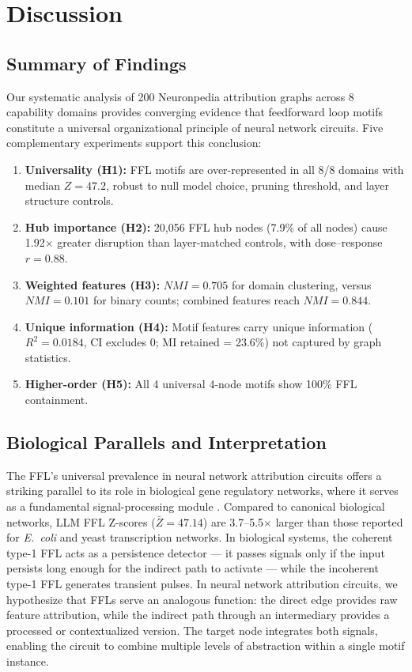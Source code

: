 \section{Discussion}\label{sec:discussion}

\subsection{Summary of Findings}
Our systematic analysis of 200 Neuronpedia attribution graphs across 8 capability domains provides converging evidence that feedforward loop motifs constitute a universal organizational principle of neural network circuits. Five complementary experiments support this conclusion:

\begin{enumerate}
\item \textbf{Universality (H1):} FFL motifs are over-represented in all 8/8 domains with median $Z=47.2$, robust to null model choice, pruning threshold, and layer structure controls.
\item \textbf{Hub importance (H2):} 20,056 FFL hub nodes (7.9\% of all nodes) cause 1.92$\times$ greater disruption than layer-matched controls, with dose--response $r=0.88$.
\item \textbf{Weighted features (H3):} $NMI=0.705$ for domain clustering, versus $NMI=0.101$ for binary counts; combined features reach $NMI=0.844$.
\item \textbf{Unique information (H4):} Motif features carry unique information ($R^2=0.0184$, CI excludes 0; MI retained = 23.6\%) not captured by graph statistics.
\item \textbf{Higher-order (H5):} All 4 universal 4-node motifs show 100\% FFL containment.
\end{enumerate}

\subsection{Biological Parallels and Interpretation}
The FFL's universal prevalence in neural network attribution circuits offers a striking parallel to its role in biological gene regulatory networks, where it serves as a fundamental signal-processing module \cite{alon2007network, mangan2003structure}. Compared to canonical biological networks, LLM FFL Z-scores ($\bar{Z} = 47.14$) are 3.7--5.5$\times$ larger than those reported for \emph{E.~coli} and yeast transcription networks.
 In biological systems, the coherent type-1 FFL acts as a persistence detector --- it passes signals only if the input persists long enough for the indirect path to activate --- while the incoherent type-1 FFL generates transient pulses. In neural network attribution circuits, we hypothesize that FFLs serve an analogous function: the direct edge provides raw feature attribution, while the indirect path through an intermediary provides a processed or contextualized version. The target node integrates both signals, enabling the circuit to combine multiple levels of abstraction within a single motif instance.

